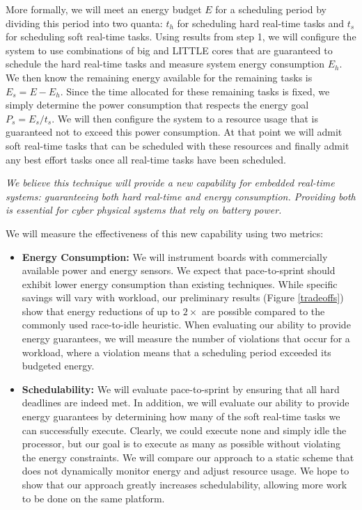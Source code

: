 More formally, we will meet an energy budget $E$ for a scheduling
period by dividing this period into two quanta: $t_h$ for scheduling
hard real-time tasks and $t_s$ for scheduling soft real-time tasks.
Using results from step 1, we will configure the system to use
combinations of big and LITTLE cores that are guaranteed to schedule
the hard real-time tasks and measure system energy consumption $E_h$.
We then know the remaining energy available for the remaining tasks is
$E_s = E - E_h$.  Since the time allocated for these remaining tasks
is fixed, we simply determine the power consumption that respects the
energy goal $P_s = E_s/t_s$.  We will then configure the system to a
resource usage that is guaranteed not to exceed this power
consumption.  At that point we will admit soft real-time tasks that
can be scheduled with these resources and finally admit any best
effort tasks once all real-time tasks have been scheduled.

\emph{We believe this technique will provide a new capability for
  embedded real-time systems: guaranteeing both hard real-time and
  energy consumption. Providing both is essential for cyber physical
  systems that rely on battery power.}

We will measure the effectiveness of this new capability using two
metrics:
\begin{itemize}
\item \textbf{Energy Consumption:} We will instrument boards with
  commercially available power and energy sensors.  We expect that
  pace-to-sprint should exhibit lower energy consumption than existing
  techniques.  While specific savings will vary with workload, our
  preliminary results (Figure \ref{tradeoffs}) show that energy
  reductions of up to $2 \times$ are possible compared to the commonly
  used race-to-idle heuristic.  When evaluating our ability to provide
  energy guarantees, we will measure the number of violations that
  occur for a workload, where a violation means that a scheduling
  period exceeded its budgeted energy.
\item \textbf{Schedulability:} We will evaluate pace-to-sprint by
  ensuring that all hard deadlines are indeed met.  In addition, we
  will evaluate our ability to provide energy guarantees by
  determining how many of the soft real-time tasks we can successfully
  execute.  Clearly, we could execute none and simply idle the
  processor, but our goal is to execute as many as possible without
  violating the energy constraints.  We will compare our approach to a
  static scheme that does not dynamically monitor energy and adjust
  resource usage.  We hope to show that our approach greatly increases
  schedulability, allowing more work to be done on the same platform.
\end{itemize}

